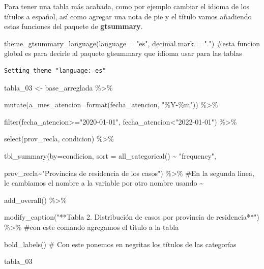 \documentclass[
  letterpaper,
  DIV=11,
  numbers=noendperiod]{scrreprt}
\newenvironment{Shaded}{\begin{snugshade}}{\end{snugshade}}
\newcommand{\AttributeTok}[1]{\textcolor[rgb]{0.40,0.45,0.13}{#1}}
\newcommand{\CommentTok}[1]{\textcolor[rgb]{0.37,0.37,0.37}{#1}}
\newcommand{\FunctionTok}[1]{\textcolor[rgb]{0.28,0.35,0.67}{#1}}
\newcommand{\NormalTok}[1]{\textcolor[rgb]{0.00,0.23,0.31}{#1}}
\newcommand{\OtherTok}[1]{\textcolor[rgb]{0.00,0.23,0.31}{#1}}
\newcommand{\SpecialCharTok}[1]{\textcolor[rgb]{0.37,0.37,0.37}{#1}}
\newcommand{\StringTok}[1]{\textcolor[rgb]{0.13,0.47,0.30}{#1}}
\begin{document}
Para tener una tabla más acabada, como por ejemplo cambiar el idioma de
los títulos a español, así como agregar una nota de pie y el título
vamos añadiendo estas funciones del paquete de \textbf{gtsummary}.

\begin{Shaded}
\begin{Highlighting}[]
 \FunctionTok{theme\_gtsummary\_language}\NormalTok{(}\AttributeTok{language =} \StringTok{"es"}\NormalTok{, }\AttributeTok{decimal.mark =} \StringTok{"."}\NormalTok{) }\CommentTok{\#esta funcion global es para decirle al paquete gtsummary que idioma usar para las tablas}
\end{Highlighting}
\end{Shaded}

\begin{verbatim}
Setting theme "language: es"
\end{verbatim}

\begin{Shaded}
\begin{Highlighting}[]
\NormalTok{tabla\_03 }\OtherTok{\textless{}{-}}\NormalTok{ base\_arreglada }\SpecialCharTok{\%\textgreater{}\%}
  
  \FunctionTok{mutate}\NormalTok{(}\AttributeTok{a\_mes\_atencion=}\FunctionTok{format}\NormalTok{(fecha\_atencion, }\StringTok{"\%Y{-}\%m"}\NormalTok{)) }\SpecialCharTok{\%\textgreater{}\%} 
 
  \FunctionTok{filter}\NormalTok{(fecha\_atencion}\SpecialCharTok{\textgreater{}=}\StringTok{"2020{-}01{-}01"}\NormalTok{, fecha\_atencion}\SpecialCharTok{\textless{}}\StringTok{"2022{-}01{-}01"}\NormalTok{) }\SpecialCharTok{\%\textgreater{}\%} 
  
  \FunctionTok{select}\NormalTok{(prov\_recla, condicion) }\SpecialCharTok{\%\textgreater{}\%} 
  
  \FunctionTok{tbl\_summary}\NormalTok{(}\AttributeTok{by=}\NormalTok{condicion, }\AttributeTok{sort =} \FunctionTok{all\_categorical}\NormalTok{() }\SpecialCharTok{\textasciitilde{}} \StringTok{"frequency"}\NormalTok{,}
              
\NormalTok{              prov\_recla}\SpecialCharTok{\textasciitilde{}}\StringTok{"Provincias de residencia de los casos"}\NormalTok{) }\SpecialCharTok{\%\textgreater{}\%}  \CommentTok{\#En la segunda linea, le cambiamos el nombre a la variable por otro nombre usando \textasciitilde{}}
  
  \FunctionTok{add\_overall}\NormalTok{() }\SpecialCharTok{\%\textgreater{}\%} 
  
  \FunctionTok{modify\_caption}\NormalTok{(}\StringTok{"**Tabla 2. Distribución de casos por provincia de residencia**"}\NormalTok{) }\SpecialCharTok{\%\textgreater{}\%} \CommentTok{\#con este comando agregamos el título a la tabla}
  
  \FunctionTok{bold\_labels}\NormalTok{() }\CommentTok{\# Con este ponemos en negritas los títulos de las categorías}




\NormalTok{tabla\_03}
\end{Highlighting}
\end{Shaded}
\end{document}
